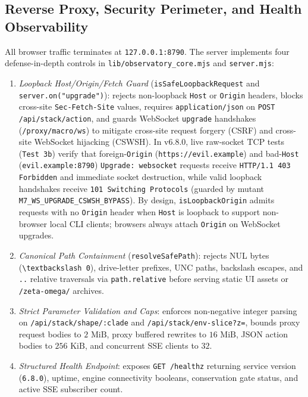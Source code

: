 \documentclass[11pt,reqno]{amsart}
\theoremstyle{definition}
\newcommand{\code}[1]{{\footnotesize\nolinkurl{#1}}}
\begin{document}
\subsection{Reverse Proxy, Security Perimeter, and Health Observability}
All browser traffic terminates at \code{127.0.0.1:8790}. The server implements four defense-in-depth controls in \code{lib/observatory\_core.mjs} and \code{server.mjs}:
\begin{enumerate}[leftmargin=1.5em,itemsep=2pt]
  \item \emph{Loopback Host/Origin/Fetch Guard} (\code{isSafeLoopbackRequest} and \code{server.on("upgrade")}): rejects non-loopback \code{Host} or \code{Origin} headers, blocks cross-site \code{Sec-Fetch-Site} values, requires \code{application/json} on \code{POST /api/stack/action}, and guards WebSocket \code{upgrade} handshakes (\code{/proxy/macro/ws}) to mitigate cross-site request forgery (CSRF) and cross-site WebSocket hijacking (CSWSH). In v6.8.0, live raw-socket TCP tests (\code{Test 3b}) verify that foreign-\code{Origin} (\code{https://evil.example}) and bad-\code{Host} (\code{evil.example:8790}) \code{Upgrade: websocket} requests receive \code{HTTP/1.1 403 Forbidden} and immediate socket destruction, while valid loopback handshakes receive \code{101 Switching Protocols} (guarded by mutant \code{M7\_WS\_UPGRADE\_CSWSH\_BYPASS}). By design, \code{isLoopbackOrigin} admits requests with no \code{Origin} header when \code{Host} is loopback to support non-browser local CLI clients; browsers always attach \code{Origin} on WebSocket upgrades.
  \item \emph{Canonical Path Containment} (\code{resolveSafePath}): rejects NUL bytes (\code{\textbackslash 0}), drive-letter prefixes, UNC paths, backslash escapes, and \code{..} relative traversals via \code{path.relative} before serving static UI assets or \code{/zeta-omega/} archives.
  \item \emph{Strict Parameter Validation and Caps}: enforces non-negative integer parsing on \code{/api/stack/shape/:clade} and \code{/api/stack/env-slice?z=}, bounds proxy request bodies to $2\text{ MiB}$, proxy buffered rewrites to $16\text{ MiB}$, JSON action bodies to $256\text{ KiB}$, and concurrent SSE clients to $32$.
  \item \emph{Structured Health Endpoint}: exposes \code{GET /healthz} returning service version (\code{6.8.0}), uptime, engine connectivity booleans, conservation gate status, and active SSE subscriber count.
\end{enumerate}
\end{document}
